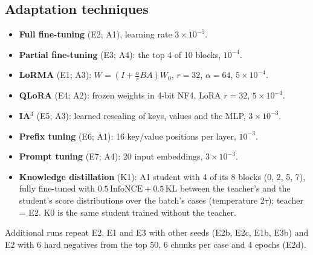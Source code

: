 \documentclass[11pt,a4paper]{article}
\begin{document}
\subsection{Adaptation techniques}
\begin{itemize}
  \item \textbf{Full fine-tuning} (E2; A1), learning rate $3\times10^{-5}$.
  \item \textbf{Partial fine-tuning} (E3; A4): the top 4 of 10 blocks, $10^{-4}$.
  \item \textbf{LoRMA} \cite{bihany2025lorma} (E1; A3): $W=(I+\tfrac{\alpha}{r}BA)W_0$, $r=32$, $\alpha=64$, $5\times10^{-4}$.
  \item \textbf{QLoRA} \cite{dettmers2023qlora} (E4; A2): frozen weights in 4-bit NF4, LoRA $r=32$, $5\times10^{-4}$.
  \item \textbf{IA$^3$} \cite{liu2022ia3} (E5; A3): learned rescaling of keys, values and the MLP, $3\times10^{-3}$.
  \item \textbf{Prefix tuning} \cite{li2021prefix} (E6; A1): 16 key/value positions per layer, $10^{-3}$.
  \item \textbf{Prompt tuning} \cite{lester2021prompt} (E7; A4): 20 input embeddings, $3\times10^{-3}$.
  \item \textbf{Knowledge distillation} \cite{hinton2015kd} (K1): A1 student with 4 of its 8 blocks (0, 2, 5, 7),
  fully fine-tuned with $0.5\,\mathrm{InfoNCE} + 0.5\,\mathrm{KL}$ between the teacher's and the student's
  score distributions over the batch's cases (temperature $2\tau$); teacher = E2.  K0 is the same student
  trained without the teacher.
\end{itemize}
Additional runs repeat E2, E1 and E3 with other seeds (E2b, E2c, E1b, E3b) and E2 with 6 hard negatives from
the top 50, 6 chunks per case and 4 epochs (E2d).
\end{document}

